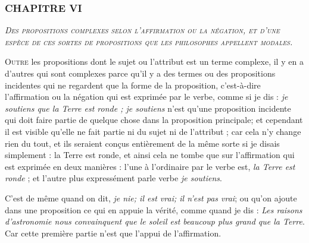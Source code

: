 \subsubsection{\centering \Large CHAPITRE VI}
\begin{center}\emph{\large\scshape Des propositions complexes selon l'affirmation ou la négation, et d'une espèce de ces sortes de propositions que les philosophes appellent modales.}\end{center}


	\lettrine{O}{utre} les propositions dont le sujet ou l'attribut est un terme complexe, il y en a d'autres qui sont complexes parce qu'il y a des termes ou des propositions incidentes qui ne regardent que la forme de la proposition, c'est-à-dire l'affirmation ou la négation qui est exprimée par le verbe, comme si je dis : \emph{je soutiens que la Terre est ronde ; je soutiens} n'est qu'une proposition incidente qui doit faire partie de quelque chose dans la proposition principale; et cependant il est visible qu'elle ne fait partie ni du sujet ni de l'attribut ; car cela n'y change rien du tout, et ils seraient conçus entièrement de la même sorte si je disais simplement : la Terre est ronde, et ainsi cela ne tombe que sur l'affirmation qui est exprimée en deux manières : l'une à l'ordinaire par le verbe est, \emph{la Terre est ronde} ; et l'autre plus expressément parle verbe \emph{je soutiens}.

C'est de même quand on dit, \emph{je nie; il est vrai; il n'est pas vrai}; ou qu'on ajoute dans une proposition ce qui en appuie la vérité, comme quand je dis : \emph{Les raisons d'astronomie nous convainquent que le soleil est beaucoup plus grand que la Terre}. Car cette première partie n'est que l'appui de l'affirmation.

